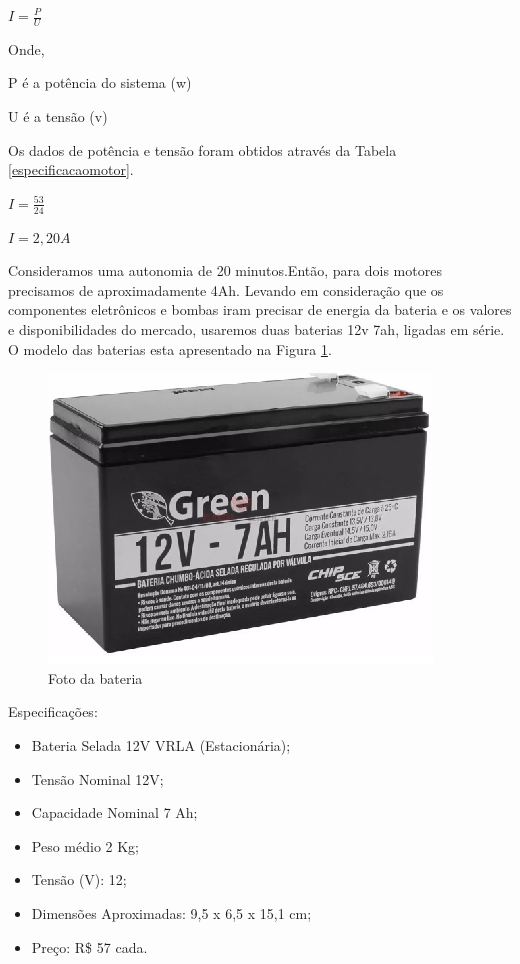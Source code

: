 $I=\frac{P}{U}$

Onde, 

P é a potência do sistema (w)

U é a tensão (v)


Os dados de potência e tensão foram  obtidos através da Tabela \ref{especificacaomotor}.

$I=\frac{53}{24}$

$I=2,20 A$

Consideramos uma autonomia de 20 minutos.Então, para dois motores precisamos de aproximadamente 4Ah. Levando em consideração que os componentes eletrônicos e bombas iram precisar de energia da bateria e os valores e disponibilidades do mercado, usaremos duas baterias 12v 7ah, ligadas em série. O modelo das baterias esta apresentado na Figura \ref{bateria7}.

\FloatBarrier
\begin{figure} [!htp]
	\centering
	\includegraphics[scale=0.3]{figuras/bateria7}
	\caption{Foto da bateria}
	\label{bateria7}
\end{figure}
\FloatBarrier


Especificações:
\begin{itemize}
    \item Bateria Selada 12V VRLA (Estacionária);
    \item Tensão Nominal 12V;
    \item Capacidade Nominal 7 Ah;
    \item Peso médio 2 Kg;
    \item Tensão (V): 12;
    \item Dimensões Aproximadas: 9,5 x 6,5 x 15,1 cm;
    \item Preço: R\$ 57 cada.  
\end{itemize}


